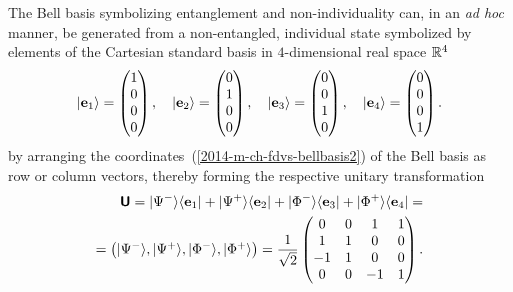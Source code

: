 The Bell basis symbolizing entanglement and non-individuality can, in an {\it ad hoc} manner, be generated from a non-entangled,
individual state
symbolized by elements of the Cartesian standard basis
in $4$-dimensional real space ${\Bbb R}^4$
\begin{equation}
\begin{split}
\vert {\bf e}_1 \rangle = \begin{pmatrix}1\\ 0\\ 0\\ 0\end{pmatrix},\quad
\vert {\bf e}_2 \rangle = \begin{pmatrix}0\\ 1\\ 0\\ 0\end{pmatrix},\quad
\vert {\bf e}_3 \rangle = \begin{pmatrix}0\\ 0\\ 1\\ 0\end{pmatrix},\quad
\vert {\bf e}_4 \rangle = \begin{pmatrix}0\\ 0\\ 0\\ 1\end{pmatrix}.
\end{split}
\label{2016-m-fdvs-csb4}
\end{equation}
by arranging the coordinates~(\ref{2014-m-ch-fdvs-bellbasis2})
of the Bell basis as row or column vectors, thereby forming the respective unitary transformation
\begin{equation}
\begin{split}
\textsf{\textbf{U}} =
\vert \Psi^- \rangle \langle {\bf e}_1  \vert  +
\vert \Psi^+ \rangle \langle {\bf e}_2  \vert  +
\vert \Phi^- \rangle \langle {\bf e}_3  \vert  +
\vert \Phi^+ \rangle \langle {\bf e}_4  \vert
=
\\
=
\begin{pmatrix}
\vert \Psi^- \rangle ,
\vert \Psi^+ \rangle ,
\vert \Phi^- \rangle ,
\vert \Phi^+ \rangle  \end{pmatrix}
=   \frac{1}{\sqrt{2}}
\begin{pmatrix}
0 & 0 &   1 &   1 \\
1 & 1 &   0 &   0 \\
-1& 1 &   0 &   0 \\
0 & 0 &  -1 &   1
 \end{pmatrix}
.
\end{split}
\label{2014-m-ch-fdvs-bellbasis2m}
\end{equation}
